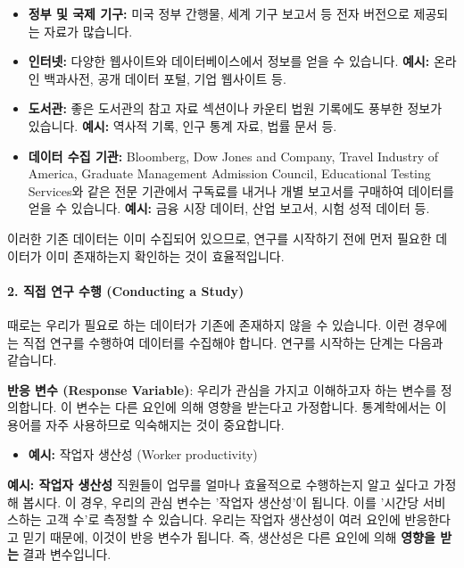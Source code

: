 \documentclass[11pt,a4paper]{book}
\newcommand{\concept}[1]{\textbf{#1}}
\theoremstyle{definition}
\begin{document}
\begin{itemize}
    \item \textbf{정부 및 국제 기구:} 미국 정부 간행물, 세계 기구 보고서 등 전자 버전으로 제공되는 자료가 많습니다.
    \item \textbf{인터넷:} 다양한 웹사이트와 데이터베이스에서 정보를 얻을 수 있습니다.
    \textbf{예시:} 온라인 백과사전, 공개 데이터 포털, 기업 웹사이트 등.
    \item \textbf{도서관:} 좋은 도서관의 참고 자료 섹션이나 카운티 법원 기록에도 풍부한 정보가 있습니다.
    \textbf{예시:} 역사적 기록, 인구 통계 자료, 법률 문서 등.
    \item \textbf{데이터 수집 기관:} Bloomberg, Dow Jones and Company, Travel Industry of America, Graduate Management Admission Council, Educational Testing Services와 같은 전문 기관에서 구독료를 내거나 개별 보고서를 구매하여 데이터를 얻을 수 있습니다.
    \textbf{예시:} 금융 시장 데이터, 산업 보고서, 시험 성적 데이터 등.
\end{itemize}
이러한 기존 데이터는 이미 수집되어 있으므로, 연구를 시작하기 전에 먼저 필요한 데이터가 이미 존재하는지 확인하는 것이 효율적입니다.

\paragraph{2. 직접 연구 수행 (Conducting a Study)}
때로는 우리가 필요로 하는 데이터가 기존에 존재하지 않을 수 있습니다. 이런 경우에는 직접 연구를 수행하여 데이터를 수집해야 합니다. 연구를 시작하는 단계는 다음과 같습니다.

\begin{tcolorbox}[infobox, title={연구 시작의 첫 번째 단계: 반응 변수 정의 (Step One in Initiating a Study)}]
\concept{반응 변수 (Response Variable)}: 우리가 관심을 가지고 이해하고자 하는 변수를 정의합니다. 이 변수는 다른 요인에 의해 영향을 받는다고 가정합니다. 통계학에서는 이 용어를 자주 사용하므로 익숙해지는 것이 중요합니다.
\begin{itemize}
    \item \textbf{예시:} 작업자 생산성 (Worker productivity)
\end{itemize}
\end{tcolorbox}

\begin{examplebox}
\textbf{예시: 작업자 생산성}
직원들이 업무를 얼마나 효율적으로 수행하는지 알고 싶다고 가정해 봅시다. 이 경우, 우리의 관심 변수는 '작업자 생산성'이 됩니다. 이를 '시간당 서비스하는 고객 수'로 측정할 수 있습니다. 우리는 작업자 생산성이 여러 요인에 반응한다고 믿기 때문에, 이것이 반응 변수가 됩니다. 즉, 생산성은 다른 요인에 의해 \textbf{영향을 받는} 결과 변수입니다.
\end{examplebox}
\end{document}
